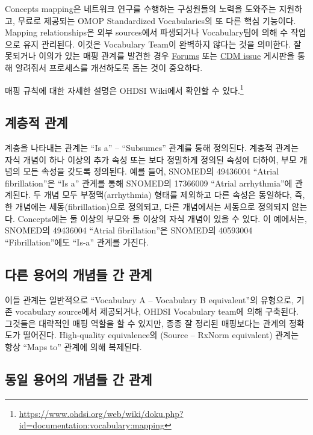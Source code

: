 \documentclass[11pt]{book}
\let\rmarkdownfootnote\footnote%
\def\footnote{\protect\rmarkdownfootnote}
\theoremstyle{definition}
\theoremstyle{definition}
\theoremstyle{definition}
\theoremstyle{remark}
\begin{document}
Concepts mapping은 네트워크 연구를 수행하는 구성원들의 노력을 도와주는
지원하고, 무료로 제공되는 OMOP Standardized Vocabularies의 또 다른 핵심
기능이다. Mapping relationships은 외부 sources에서 파생되거나
Vocabulary팀에 의해 수 작업으로 유지 관리된다. 이것은 Vocabulary Team이
완벽하지 않다는 것을 의미한다. 잘못되거나 이의가 있는 매핑 관계를 발견한
경우 \href{https://forums.ohdsi.org}{Forums} 또는
\href{https://github.com/OHDSI/CommonDataModel/issues}{CDM issue}
게시판을 통해 알려줘서 프로세스를 개선하도록 돕는 것이 중요하다.

매핑 규칙에 대한 자세한 설명은 OHDSI Wiki에서 확인할 수 있다.\footnote{\url{https://www.ohdsi.org/web/wiki/doku.php?id=documentation:vocabulary:mapping}}

\subsection{계층적 관계}\label{-}

계층을 나타내는 관계는 ``Is a'' -- ``Subsumes'' 관계를 통해 정의된다.
계층적 관계는 자식 개념이 하나 이상의 추가 속성 또는 보다 정밀하게
정의된 속성에 더하여, 부모 개념의 모든 속성을 갖도록 정의된다. 예를
들어, SNOMED의 49436004 ``Atrial fibrillation''은 ``Is a'' 관계를 통해
SNOMED의 17366009 ``Atrial arrhythmia''에 관계된다. 두 개념 모두
부정맥(arrhythmia) 형태를 제외하고 다른 속성은 동일하다, 즉, 한 개념에는
세동(fibrillation)으로 정의되고, 다른 개념에서는 세동으로 정의되지
않는다. Concepts에는 둘 이상의 부모와 둘 이상의 자식 개념이 있을 수
있다. 이 예에서는, SNOMED의 49436004 ``Atrial fibrillation''은 SNOMED의
40593004 ``Fibrillation''에도 ``Is-a'' 관계를 가진다.

\subsection{다른 용어의 개념들 간 관계}\label{----}

이들 관계는 일반적으로 ``Vocabulary A -- Vocabulary B equivalent''의
유형으로, 기존 vocabulary source에서 제공되거나, OHDSI Vocabulary team에
의해 구축된다. 그것들은 대략적인 매핑 역할을 할 수 있지만, 종종 잘
정리된 매핑보다는 관계의 정확도가 떨어진다. High-quality equivalence의
(Source -- RxNorm equivalent) 관계는 항상 ``Maps to'' 관계에 의해
복제된다.

\subsection{동일 용어의 개념들 간 관계}\label{----}
\end{document}
